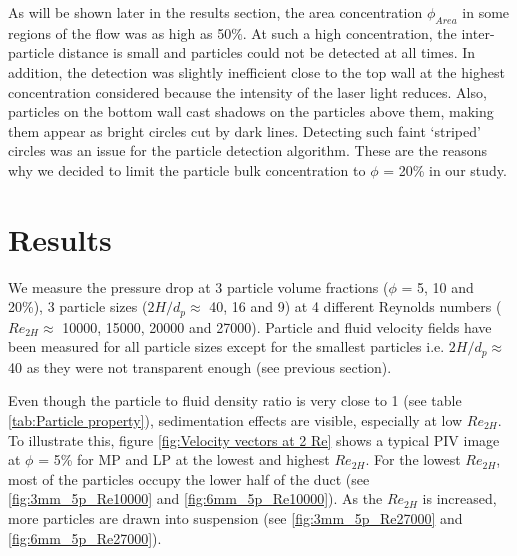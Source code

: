 \documentclass{jfm}
\def\sz#1{{\textcolor{black}{#1}}}
\begin{document}
As will be shown later in the results section, the area concentration $\phi_{Area}$ in some regions of the flow was as high as 50\%. At such a high concentration, the inter-particle distance is small and particles could not be detected at all times. 
In addition, the detection was slightly inefficient close to the top wall at the highest concentration considered because the intensity of the laser light reduces. Also, particles on the bottom wall cast shadows on the particles above them, making them appear as bright circles cut by dark lines. Detecting such faint `striped' circles was an issue for the particle detection algorithm. These are the reasons why we decided to limit the particle bulk concentration to $\phi$ = 20\% in our study.

\section{Results}\label{sec:Results}

We measure the pressure drop at 3 particle volume fractions ($\phi$ = 5, 10 and 20\%), 3 particle sizes ($2H/d_p\approx$ 40, 16 and 9) at 4 different Reynolds numbers ($Re_{2H}\approx$ 10000, 15000, 20000 and 27000). Particle and fluid velocity field\sz{s} have been measured for all particle sizes except for the smallest particles i.e. $2H/d_p\approx$ 40 as they were not transparent enough (see previous section). 

Even though the particle to fluid density ratio is very close to 1 (see table \ref{tab:Particle property}), sedimentation effects are visible, especially at low $Re_{2H}$. To illustrate this, figure \ref{fig:Velocity vectors at 2 Re} shows a typical PIV image at $\phi$ = 5\% for MP and LP at the lowest and highest $Re_{2H}$. For the lowest $Re_{2H}$, most of the particles occupy the lower half of the duct (see \ref{fig:3mm_5p_Re10000} and \ref{fig:6mm_5p_Re10000}). As the $Re_{2H}$ is increased, more particles are drawn into suspension (see \ref{fig:3mm_5p_Re27000} and \ref{fig:6mm_5p_Re27000}). 
\end{document}
